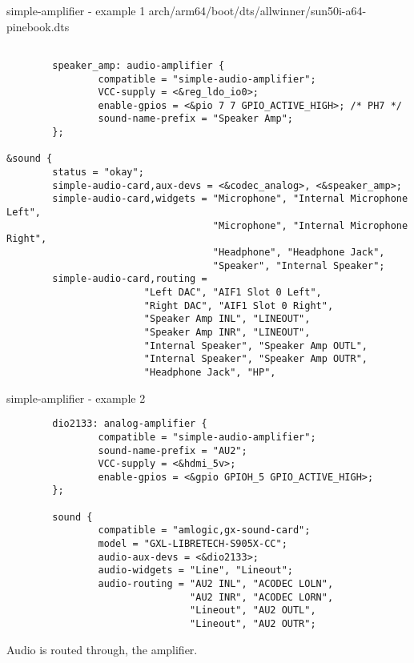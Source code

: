 \begin{frame}[fragile]{simple-amplifier - example 1}
arch/arm64/boot/dts/allwinner/sun50i-a64-pinebook.dts
  \begin{block}{}
    \fontsize{7}{6}\selectfont
    \begin{verbatim}

        speaker_amp: audio-amplifier {
                compatible = "simple-audio-amplifier";
                VCC-supply = <&reg_ldo_io0>;
                enable-gpios = <&pio 7 7 GPIO_ACTIVE_HIGH>; /* PH7 */
                sound-name-prefix = "Speaker Amp";
        };

&sound {
        status = "okay";
        simple-audio-card,aux-devs = <&codec_analog>, <&speaker_amp>;
        simple-audio-card,widgets = "Microphone", "Internal Microphone Left",
                                    "Microphone", "Internal Microphone Right",
                                    "Headphone", "Headphone Jack",
                                    "Speaker", "Internal Speaker";
        simple-audio-card,routing =
                        "Left DAC", "AIF1 Slot 0 Left",
                        "Right DAC", "AIF1 Slot 0 Right",
                        "Speaker Amp INL", "LINEOUT",
                        "Speaker Amp INR", "LINEOUT",
                        "Internal Speaker", "Speaker Amp OUTL",
                        "Internal Speaker", "Speaker Amp OUTR",
                        "Headphone Jack", "HP",
    \end{verbatim}
  \end{block}
\end{frame}

\begin{frame}[fragile]{simple-amplifier - example 2}
  \begin{block}{}
    \fontsize{7}{6}\selectfont
    \begin{verbatim}
        dio2133: analog-amplifier {
                compatible = "simple-audio-amplifier";
                sound-name-prefix = "AU2";
                VCC-supply = <&hdmi_5v>;
                enable-gpios = <&gpio GPIOH_5 GPIO_ACTIVE_HIGH>;
        };

        sound {
                compatible = "amlogic,gx-sound-card";
                model = "GXL-LIBRETECH-S905X-CC";
                audio-aux-devs = <&dio2133>;
                audio-widgets = "Line", "Lineout";
                audio-routing = "AU2 INL", "ACODEC LOLN",
                                "AU2 INR", "ACODEC LORN",
                                "Lineout", "AU2 OUTL",
                                "Lineout", "AU2 OUTR";
    \end{verbatim}
  \end{block}
  Audio is routed through, the amplifier.
\end{frame}

